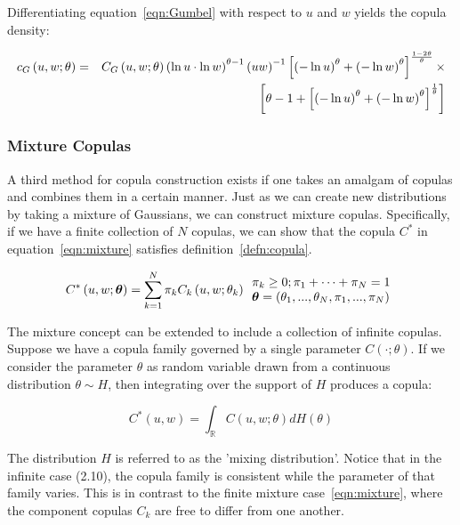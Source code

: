 \documentclass[12pt]{article}
\begin{document}
Differentiating equation~\ref{eqn:Gumbel} with respect to $u$ and $w$ yields the copula density:

\begin{eqnarray}
c_{G}\left(u,w;\theta\right) &=& C_{G}\left(u,w;\theta\right)\left(\ln u\cdot\ln w\right)^{\theta -1}\left(uw\right)^{-1}\left[\left(-\ln u\right)^{\theta}+\left(-\ln w\right)^{\theta}\right]^{\frac{1-2\theta}{\theta}}\times  \notag \\
&& \left[\theta -1+\left[\left(-\ln u\right)^{\theta}+\left(-\ln w\right)^{\theta}\right]^{\frac{1}{\theta}}\right]
\end{eqnarray}

\subsubsection{Mixture Copulas} \label{sec:mixtureCopula}

A third method for copula construction exists if one takes an amalgam of copulas and combines them in a certain manner. Just as we can create new distributions by taking a mixture of Gaussians, we can construct mixture copulas. Specifically, if we have a finite collection of $N$ copulas, we can show that the copula $C^{\ast }$ in equation~\ref{eqn:mixture} satisfies definition~\ref{defn:copula}.

\begin{equation} \label{eqn:mixture}
C^{\ast}\left(u,w;\boldsymbol{\theta}\right) = \sum_{k=1}^{N}\pi_{k}C_{k}\left(u,w;\theta _{k}\right)
\begin{array}{c}
\pi _{k}\geq 0; \pi _{1}+\cdots +\pi _{N}=1 \\ 
\multicolumn{1}{l}{\boldsymbol{\theta} = \left(\theta_{1},...,\theta_{N},\pi_{1},...,\pi_{N}\right)}
\end{array}
\end{equation}

The mixture concept can be extended to include a collection of infinite copulas. Suppose we have a copula family governed by a single parameter $C\left(\cdot;\theta\right)$. If we consider the parameter $\theta$ as random variable drawn from a continuous distribution $\theta\sim H$, then integrating over the support of $H$ produces a copula:

\begin{equation}
C^{\ast}\left( u,w\right) =\int_{\mathbb{R}}C\left(u,w;\theta\right)dH\left(\theta\right)
\end{equation}

The distribution $H$ is referred to as the 'mixing distribution'. Notice that in the infinite case (2.10), the copula family is consistent while the parameter of that family varies. This is in contrast to the finite mixture case~\ref{eqn:mixture}, where the component copulas $C_{k}$ are free to differ from one another.
\end{document}
